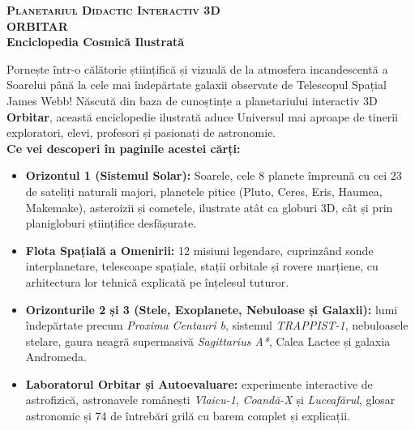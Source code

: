 \documentclass[11pt,a4paper,twoside,openany]{book}
\begin{document}
\vspace*{0.8cm}
\begin{center}
  {\color{orbitarCyan}\normalsize\bfseries\scshape Planetariul Didactic Interactiv 3D}\\[0.25cm]
  {\color{white}\fontsize{26}{32}\selectfont\bfseries ORBITAR}\\[0.15cm]
  {\color{amber!90!yellow}\large\bfseries Enciclopedia Cosmică Ilustrată}
\end{center}

\vspace{0.5cm}
\begin{center}
\begin{tcolorbox}[
  enhanced,
  width=0.88\textwidth,
  colback=black!85!orbitarSpaceBg,
  colframe=orbitarAmber!80!yellow,
  boxrule=0.8pt,
  arc=5pt,
  coltext=white,
  top=10pt,
  bottom=10pt,
  left=12pt,
  right=12pt
]
\normalsize
Pornește într-o călătorie științifică și vizuală de la atmosfera incandescentă a Soarelui până la cele mai îndepărtate galaxii observate de Telescopul Spațial James Webb! Născută din baza de cunoștințe a planetariului interactiv 3D \textbf{Orbitar}, această enciclopedie ilustrată aduce Universul mai aproape de tinerii exploratori, elevi, profesori și pasionați de astronomie.\\[8pt]
\textbf{\color{amber!90!yellow}Ce vei descoperi în paginile acestei cărți:}\\[4pt]
\begin{itemize}[leftmargin=1.4em, itemsep=3pt, topsep=2pt]
  \item \textbf{Orizontul 1 (Sistemul Solar):} Soarele, cele 8 planete împreună cu cei 23 de sateliți naturali majori, planetele pitice (Pluto, Ceres, Eris, Haumea, Makemake), asteroizii și cometele, ilustrate atât ca globuri 3D, cât și prin planigloburi științifice desfășurate.
  \item \textbf{Flota Spațială a Omenirii:} 12 misiuni legendare, cuprinzând sonde interplanetare, telescoape spațiale, stații orbitale și rovere marțiene, cu arhitectura lor tehnică explicată pe înțelesul tuturor.
  \item \textbf{Orizonturile 2 și 3 (Stele, Exoplanete, Nebuloase și Galaxii):} lumi îndepărtate precum \emph{Proxima Centauri b}, sistemul \emph{TRAPPIST-1}, nebuloasele stelare, gaura neagră supermasivă \emph{Sagittarius A*}, Calea Lactee și galaxia Andromeda.
  \item \textbf{Laboratorul Orbitar și Autoevaluare:} experimente interactive de astrofizică, astronavele românești \emph{Vlaicu-1}, \emph{Coandă-X} și \emph{Luceafărul}, glosar astronomic și 74 de întrebări grilă cu barem complet și explicații.
\end{itemize}
\end{tcolorbox}
\end{center}
\end{document}
